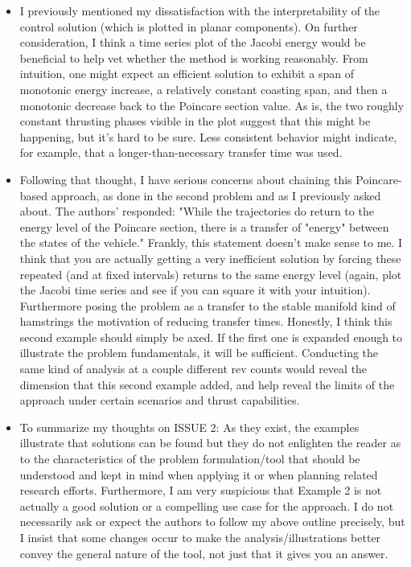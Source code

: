 \documentclass[11pt]{article}
\begin{document}
\begin{itemize}
    \item
        \begin{itshape}
            I previously mentioned my dissatisfaction with the interpretability of the control solution (which is plotted in planar components).  On further consideration, I think a time series plot of the Jacobi energy would be beneficial to help vet whether the method is working reasonably.  From intuition, one might expect an efficient solution to exhibit a span of monotonic energy increase, a relatively constant coasting span, and then a monotonic decrease back to the Poincare section value.  As is, the two roughly constant thrusting phases visible in the plot suggest that this might be happening, but it's hard to be sure.  Less consistent behavior might indicate, for example, that a longer-than-necessary transfer time was used.  
        \end{itshape}

    \item 
        \begin{itshape}
            Following that thought, I have serious concerns about chaining this Poincare-based approach, as done in the second problem and as I previously asked about.  The authors' responded: "While the trajectories do return to the energy level of the Poincare section, there is a transfer of "energy" between the states of the vehicle." Frankly, this statement doesn't make sense to me.  I think that you are actually getting a very inefficient solution by forcing these repeated (and at fixed intervals) returns to the same energy level (again, plot the Jacobi time series and see if you can square it with your intuition).  Furthermore posing the problem as a transfer to the stable manifold kind of hamstrings the motivation of reducing transfer times.  Honestly, I think this second example should simply be axed.  If the first one is expanded enough to illustrate the problem fundamentals, it will be sufficient.  Conducting the same kind of analysis at a couple different rev counts would
            reveal the dimension that this second example added, and help reveal the limits of the approach under certain scenarios and thrust capabilities.
        \end{itshape}

    \item 
        \begin{itshape}
            To summarize my thoughts on ISSUE 2:
            As they exist, the examples illustrate that solutions can be found but they do not enlighten the reader as to the characteristics of the problem formulation/tool that should be understood and kept in mind when applying it or when planning related research efforts.  Furthermore, I am very suspicious that Example 2 is not actually a good solution or a compelling use case for the approach.  I do not necessarily ask or expect the authors to follow my above outline precisely, but I insist that some changes occur to make the analysis/illustrations better convey the general nature of the tool, not just that it gives you an answer.  


\end{itshape}
\end{itemize}
\end{document}
